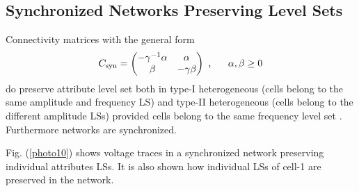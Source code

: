 \subsection{Synchronized Networks Preserving Level Sets}
\begin{Statement} 
Connectivity matrices with the general form
\begin{equation}
   C_{\text{syn}} = 
    \begin{pmatrix}
        -\gamma^{-1}\alpha & \alpha\\
        \beta & -\gamma \beta
    \end{pmatrix}
    \text{ , } \hspace{0.5cm} \alpha, \beta \geq 0
    \label{e29}
\end{equation}
do preserve attribute level set both in type-\textrm{I} heterogeneous (cells belong to the same amplitude and frequency LS) and type-\textrm{II} heterogeneous (cells belong to the different amplitude LSs) provided cells belong to the same frequency level set . Furthermore networks are synchronized.
\end{Statement} 

Fig. (\ref{photo10}) shows voltage traces in a synchronized network preserving individual attributes LSs. It is also shown how individual LSs of cell-1 are preserved in the network.

